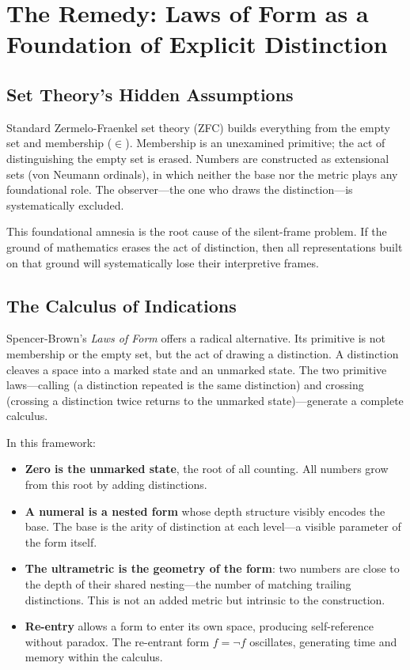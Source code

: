 \documentclass[12pt,a4paper]{article}
\theoremstyle{definition}
\theoremstyle{remark}
\begin{document}
\section{The Remedy: Laws of Form as a Foundation of Explicit Distinction}

\subsection{Set Theory's Hidden Assumptions}

Standard Zermelo-Fraenkel set theory (ZFC) builds everything from the empty set and membership ($\in$). Membership is an unexamined primitive; the act of distinguishing the empty set is erased. Numbers are constructed as extensional sets (von Neumann ordinals), in which neither the base nor the metric plays any foundational role. The observer---the one who draws the distinction---is systematically excluded.

This foundational amnesia is the root cause of the silent-frame problem. If the ground of mathematics erases the act of distinction, then all representations built on that ground will systematically lose their interpretive frames.

\subsection{The Calculus of Indications}

Spencer-Brown's \emph{Laws of Form} \cite{spencerbrown1969} offers a radical alternative. Its primitive is not membership or the empty set, but the act of drawing a distinction. A distinction cleaves a space into a marked state and an unmarked state. The two primitive laws---calling (a distinction repeated is the same distinction) and crossing (crossing a distinction twice returns to the unmarked state)---generate a complete calculus.

In this framework:

\begin{itemize}[nosep]
    \item \textbf{Zero is the unmarked state}, the root of all counting. All numbers grow from this root by adding distinctions.
    \item \textbf{A numeral is a nested form} whose depth structure visibly encodes the base. The base is the arity of distinction at each level---a visible parameter of the form itself.
    \item \textbf{The ultrametric is the geometry of the form}: two numbers are close to the depth of their shared nesting---the number of matching trailing distinctions. This is not an added metric but intrinsic to the construction.
    \item \textbf{Re-entry} allows a form to enter its own space, producing self-reference without paradox. The re-entrant form $f = \neg f$ oscillates, generating time and memory within the calculus.
\end{itemize}
\end{document}
